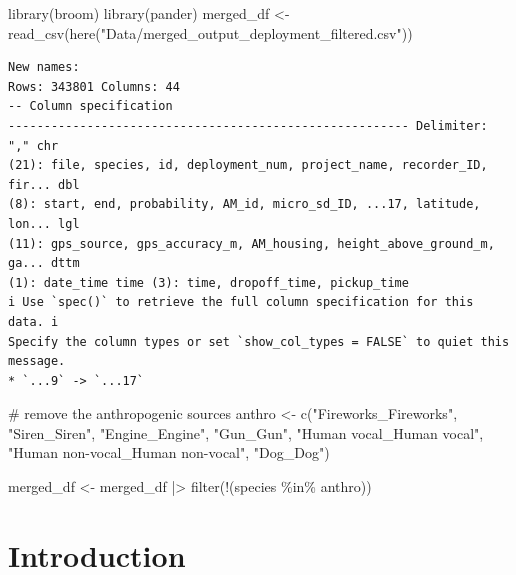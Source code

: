\documentclass[
  letterpaper,
  DIV=11,
  numbers=noendperiod]{scrartcl}
\newenvironment{Shaded}{\begin{snugshade}}{\end{snugshade}}
\newcommand{\CommentTok}[1]{\textcolor[rgb]{0.37,0.37,0.37}{#1}}
\newcommand{\FunctionTok}[1]{\textcolor[rgb]{0.28,0.35,0.67}{#1}}
\newcommand{\NormalTok}[1]{\textcolor[rgb]{0.00,0.23,0.31}{#1}}
\newcommand{\OtherTok}[1]{\textcolor[rgb]{0.00,0.23,0.31}{#1}}
\newcommand{\SpecialCharTok}[1]{\textcolor[rgb]{0.37,0.37,0.37}{#1}}
\newcommand{\StringTok}[1]{\textcolor[rgb]{0.13,0.47,0.30}{#1}}
\begin{document}
\begin{Shaded}
\begin{Highlighting}[]
\FunctionTok{library}\NormalTok{(broom)}
\FunctionTok{library}\NormalTok{(pander)}
\NormalTok{merged\_df }\OtherTok{\textless{}{-}} \FunctionTok{read\_csv}\NormalTok{(}\FunctionTok{here}\NormalTok{(}\StringTok{"Data/merged\_output\_deployment\_filtered.csv"}\NormalTok{))}
\end{Highlighting}
\end{Shaded}

\begin{verbatim}
New names:
Rows: 343801 Columns: 44
-- Column specification
-------------------------------------------------------- Delimiter: "," chr
(21): file, species, id, deployment_num, project_name, recorder_ID, fir... dbl
(8): start, end, probability, AM_id, micro_sd_ID, ...17, latitude, lon... lgl
(11): gps_source, gps_accuracy_m, AM_housing, height_above_ground_m, ga... dttm
(1): date_time time (3): time, dropoff_time, pickup_time
i Use `spec()` to retrieve the full column specification for this data. i
Specify the column types or set `show_col_types = FALSE` to quiet this message.
* `...9` -> `...17`
\end{verbatim}

\begin{Shaded}
\begin{Highlighting}[]
\CommentTok{\# remove the anthropogenic sources}
\NormalTok{anthro }\OtherTok{\textless{}{-}} \FunctionTok{c}\NormalTok{(}\StringTok{"Fireworks\_Fireworks"}\NormalTok{, }\StringTok{"Siren\_Siren"}\NormalTok{, }\StringTok{"Engine\_Engine"}\NormalTok{, }\StringTok{"Gun\_Gun"}\NormalTok{, }
  \StringTok{"Human vocal\_Human vocal"}\NormalTok{, }\StringTok{"Human non{-}vocal\_Human non{-}vocal"}\NormalTok{, }\StringTok{"Dog\_Dog"}\NormalTok{)}

\NormalTok{merged\_df }\OtherTok{\textless{}{-}}\NormalTok{ merged\_df }\SpecialCharTok{|\textgreater{}} \FunctionTok{filter}\NormalTok{(}\SpecialCharTok{!}\NormalTok{(species }\SpecialCharTok{\%in\%}\NormalTok{ anthro))}
\end{Highlighting}
\end{Shaded}

\linespread{2}

\section{Introduction}\label{introduction}
\end{document}
